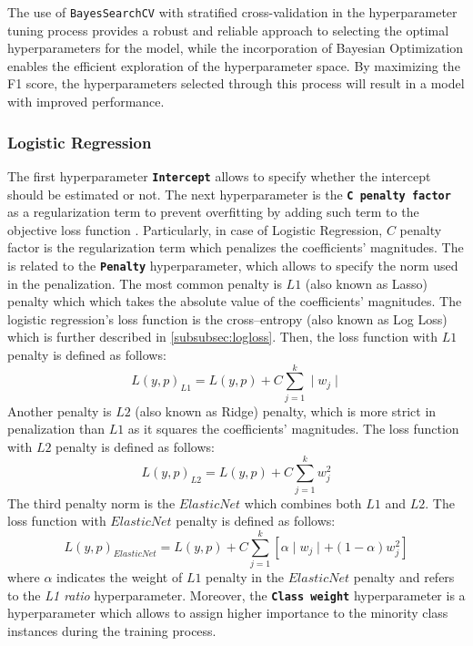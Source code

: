The use of \lstinline{BayesSearchCV} with stratified cross-validation in the hyperparameter tuning process provides a robust and reliable approach to selecting the optimal hyperparameters for the model, while the incorporation of Bayesian Optimization enables the efficient exploration of the hyperparameter space.
By maximizing the F1 score, the hyperparameters selected through this process will result in a model with improved performance.



\subsubsection{Logistic Regression}
The first hyperparameter \textbf{\texttt{Intercept}} allows to specify whether the intercept should be estimated or not.
The next hyperparameter is the \textbf{\texttt{C penalty factor}} as a regularization term to prevent overfitting by adding such term to the objective loss function \citep{pramoditha2021mitigate}. Particularly, in case of Logistic Regression, $C$ penalty factor is the regularization term which penalizes the coefficients' magnitudes.
The is related to the \textbf{\texttt{Penalty}} hyperparameter, which allows to specify the norm used in the penalization.
The most common penalty is $L1$ (also known as Lasso) penalty which which takes the absolute value of the coefficients' magnitudes.
The logistic regression's loss function is the cross--entropy (also known as Log Loss) which is further described in \autoref{subsubsec:logloss}. Then, the loss function with  $L1$ penalty is defined as follows:
\begin{equation}\label{eq}
    L(y, p)_{L1}  = L(y, p) + C \sum_{j=1}^{k} \mid w_j \mid
\end{equation}
Another penalty is $L2$ (also known as Ridge) penalty, which is more strict in penalization than $L1$ as it squares the coefficients' magnitudes. The loss function with $L2$ penalty is defined as follows:
\begin{equation}\label{eq}
    L(y, p)_{L2}  = L(y, p) + C \sum_{j=1}^{k} w_j^2
\end{equation}
The third penalty norm is the $ElasticNet$ which combines both $L1$ and $L2$. The loss function with $ElasticNet$ penalty is defined as follows:
\begin{equation}\label{eq}
    L(y, p)_{ElasticNet} = L(y, p) + C \sum_{j=1}^{k} \left[ \alpha \mid w_j \mid + (1-\alpha) w_j^2 \right]
\end{equation}
where $\alpha$ indicates the weight of $L1$ penalty in the $ElasticNet$ penalty and refers to the \textit{L1 ratio} hyperparameter.
Moreover, the  \textbf{\texttt{Class weight}} hyperparameter is a hyperparameter which allows to assign higher importance to the minority class instances during the training process.


